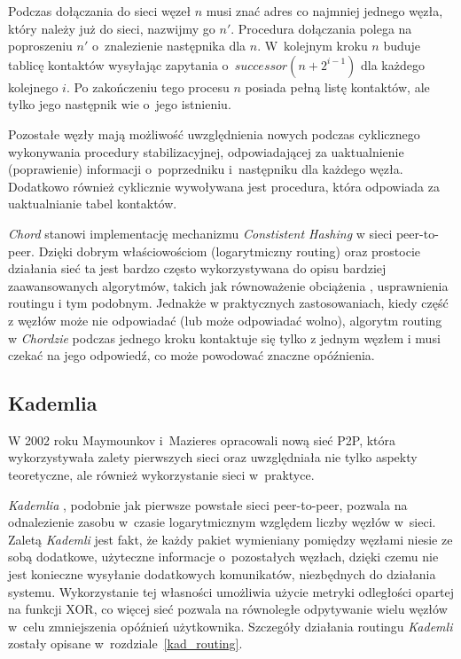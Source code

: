 \documentclass[a4paper,11pt]{scrartcl}
\begin{document}
Podczas dołączania do sieci węzeł $n$ musi znać adres co najmniej jednego węzła, który należy już do sieci, nazwijmy go $n'$. Procedura dołączania polega na poproszeniu $n'$ o~znalezienie następnika dla $n$. W~kolejnym kroku $n$ buduje tablicę kontaktów wysyłając zapytania o~$successor(n + 2^{i-1})$ dla każdego kolejnego $i$. Po zakończeniu tego procesu $n$ posiada pełną listę kontaktów, ale tylko jego następnik wie o~jego istnieniu.

Pozostałe węzły mają możliwość uwzględnienia nowych podczas cyklicznego wykonywania procedury stabilizacyjnej, odpowiadającej za uaktualnienie (poprawienie) informacji o~poprzedniku i~następniku dla każdego węzła. Dodatkowo również cyklicznie wywoływana jest procedura, która odpowiada za uaktualnianie tabel kontaktów.

\textit{Chord} stanowi implementację mechanizmu \textit{Constistent Hashing} w sieci peer-to-peer. Dzięki dobrym właściowościom (logarytmiczny routing) oraz prostocie działania sieć ta jest bardzo często wykorzystywana do opisu bardziej zaawansowanych algorytmów, takich jak równoważenie obciążenia \cite{rao2003load}, usprawnienia routingu \cite{manku2004know} i tym podobnym. Jednakże w praktycznych zastosowaniach, kiedy część z węzłów może nie odpowiadać (lub może odpowiadać wolno), algorytm routing w \textit{Chordzie} podczas jednego kroku kontaktuje się tylko z jednym węzłem i musi czekać na jego odpowiedź, co może powodować znaczne opóźnienia. 


\subsection{Kademlia}
W 2002 roku Maymounkov i~Mazieres opracowali nową sieć P2P, która wykorzystywała zalety pierwszych sieci oraz uwzględniała nie tylko aspekty teoretyczne, ale również wykorzystanie sieci w~praktyce.

\textit{Kademlia} \cite{maymounkov2002kademlia}, podobnie jak pierwsze powstałe sieci peer-to-peer, pozwala na odnalezienie zasobu w~czasie logarytmicznym względem liczby węzłów w~sieci. Zaletą \textit{Kademli} jest fakt, że każdy pakiet wymieniany pomiędzy węzłami niesie ze sobą dodatkowe, użyteczne informacje o~pozostałych węzłach, dzięki czemu nie jest konieczne wysyłanie dodatkowych komunikatów, niezbędnych do działania systemu. Wykorzystanie tej własności umożliwia użycie metryki odległości opartej na funkcji XOR, co więcej sieć pozwala na równoległe odpytywanie wielu węzłów w~celu zmniejszenia opóźnień użytkownika. Szczegóły działania routingu \textit{Kademli} zostały opisane w~rozdziale~\ref{kad_routing}.
\end{document}
